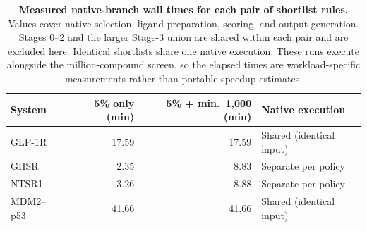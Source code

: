 \begin{table}[htbp]
\centering
\caption{\textbf{Measured native-branch wall times for each pair of shortlist rules.} Values cover native selection, ligand preparation, scoring, and output generation. Stages 0--2 and the larger Stage-3 union are shared within each pair and are excluded here. Identical shortlists share one native execution. These runs execute alongside the million-compound screen, so the elapsed times are workload-specific measurements rather than portable speedup estimates.}
\label{tab:floor-timing}
\footnotesize
\setlength{\tabcolsep}{6pt}
\begin{tabular}{@{}lrrl@{}}
\toprule
System & 5\% only (min) & 5\% + min.\ 1,000 (min) & Native execution \\
\midrule
GLP-1R & 17.59 & 17.59 & Shared (identical input) \\
GHSR & 2.35 & 8.83 & Separate per policy \\
NTSR1 & 3.26 & 8.88 & Separate per policy \\
MDM2--p53 & 41.66 & 41.66 & Shared (identical input) \\
\bottomrule
\end{tabular}
\end{table}
